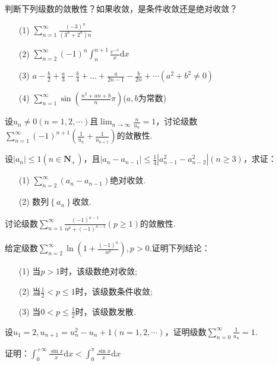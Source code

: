 \begin{xiti}
	\item 判断下列级数的敛散性？如果收敛，是条件收敛还是绝对收敛？
	\begin{enumerate}
		\item [(1)]$\sum_{n=1}^{\infty} \frac{(-3)^{n}}{\left(3^{n}+2^{n}\right) n}$
		\item [(2)]$\sum_{n=2}^{\infty}(-1)^{n} \int_{n}^{n+1} \frac{e^{-x}}{x} \mathrm{d} x$
		\item [(3)]$a-\frac{b}{2}+\frac{a}{3}-\frac{b}{4}+\dots+\frac{a}{2 n-1}-\frac{b}{2 n}+\cdots\left(a^{2}+b^{2} \neq 0\right)$
		\item [(4)]$\sum_{n=1}^{\infty} \sin \left(\frac{n^{2}+a n+b}{n} \pi\right)$($a,b$为常数)
	\end{enumerate}
	\item 设$u_{n} \neq 0(n=1,2, \cdots)$且$\lim _{n \rightarrow \infty} \frac{n}{u_{n}}=1$，讨论级数$\sum_{n=1}^{\infty}(-1)^{n+1}\left(\frac{1}{u_{n}}+\frac{1}{u_{n+1}}\right)$的敛散性.
	\item 设$|a_{n} | \leqslant 1\left(n \in \mathbf{N}_{+}\right)$，且$\left|a_{n}-a_{n-1}\right| \leqslant \frac{1}{4}\left|a_{n-1}^{2}-a_{n-2}^{2}\right|(n \geqslant 3)$，求证：
	\begin{enumerate}
		\item [(1)] $\sum_{n=2}^{\infty}\left(a_{n}-a_{n-1}\right)$绝对收敛.
		\item [(2)] 数列$\left\{a_{n}\right\}$收敛.
	\end{enumerate}
	\item 讨论级数$\sum_{n=1}^{\infty} \frac{(-1)^{n-1}}{n^{p}+(-1)^{n-1}}(p \geqslant 1)$的敛散性.
	\item 给定级数$\sum_{n=2}^{\infty} \ln \left(1+\frac{(-1)^{n}}{n^{p}}\right), p>0$.证明下列结论：
	\begin{enumerate}
		\item [(1)]当$p>1$时，该级数绝对收敛;
		\item [(2)]当$\frac{1}{2}<p\leq 1$时，该级数条件收敛;
		\item [(3)]当$0<p\leq \frac{1}{2}$时，该级数发散.
	\end{enumerate}
	
	\item 设$u _ { 1 } = 2 , u _ { n + 1 } = u _ { n } ^ { 2 } - u _ { n } + 1 ( n = 1,2 , \cdots )$，证明级数$\sum _ { n = 0 } ^ { \infty } \frac { 1 } { u _ { n } } = 1$.
	
	\item 证明：$\int _ { 0 } ^ { + \infty } \frac { \sin x } { x } \mathrm { d } x < \int _ { 0 } ^ { \pi } \frac { \sin x } { x } \mathrm { d } x$	
\end{xiti}



